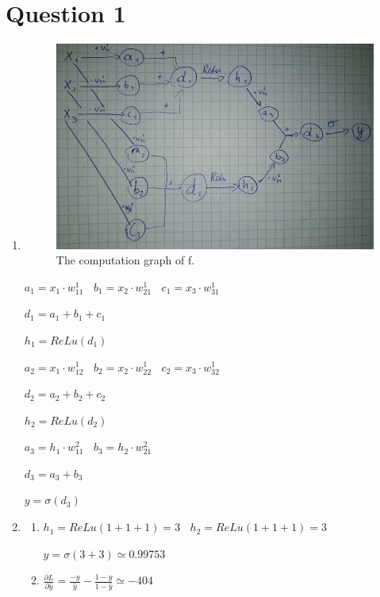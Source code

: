 \documentclass{article}
\begin{document}
\section*{Question 1} 
\begin{enumerate}[label = (\alph*)]
    \item
    
\begin{figure}[h!]
    \centering
    \includegraphics[scale=1.5]{figures/backprop.jpg}
    \caption{The computation graph of f.}
\end{figure}

$a_1 = x_1 \cdot w_{11}^1 \; \;$
$b_1 = x_2 \cdot w_{21}^1 \; \;$
$c_1 = x_3 \cdot w_{31}^1 \; \;$

$d_1=a_1 + b_1 + c_1$

$h_1 = ReLu(d_1)$

$a_2 = x_1 \cdot w_{12}^1 \; \;$
$b_2 = x_2 \cdot w_{22}^1 \; \;$
$c_2 = x_3 \cdot w_{32}^1 \; \;$

$d_2=a_2 + b_2 + c_2$

$h_2 = ReLu(d_2)$

$a_3 = h_1 \cdot w_{11}^2 \; \;$
$b_3 = h_2 \cdot w_{21}^2 \; \;$

$d_3=a_3 + b_3$

$y=\sigma(d_3)$

\item 
	\begin{enumerate}[label = (\roman*)]
		\item
		$h_1=ReLu(1+1+1) = 3 \; \;$
		$h_2=ReLu(1+1+1) = 3 $
		
		$y=\sigma(3+3) \simeq 0.99753$
		
		\item
		$\frac{\partial L}{\partial \hat{y}} = \frac{-y}{\hat{y}}-\frac{1-y}{1-\hat{y}}\simeq -404 \; \; \;$ 
		

\end{enumerate}
\end{enumerate}
\end{document}
